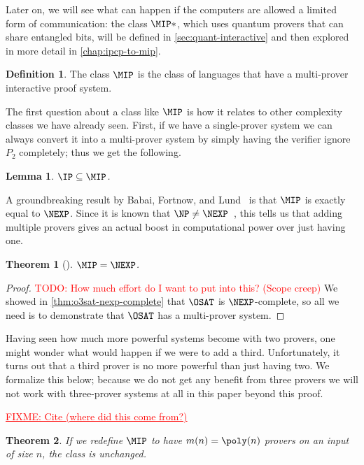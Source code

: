 \documentclass[english,12pt]{reedthesis}
\theoremstyle{plain}
\newtheorem{thm}{Theorem}[section]
\newtheorem{lemma}[lemma]{Lemma}
\theoremstyle{definition}
\newtheorem{defn}[defn]{Definition}
\theoremstyle{remark}
\newcommand{\TODO}[1]{\textcolor{red}{TODO: #1}}
\newcommand{\FIXME}[1]{\textcolor{red}{\underline{FIXME: #1}}}
\begin{document}
Later on, we will see what can happen if the computers are allowed a limited
form of communication: the class $\MIP*$, which uses quantum provers that can
share entangled bits, will be defined in \cref{sec:quant-interactive} and then
explored in more detail in \cref{chap:ipcp-to-mip}.

\begin{defn}\label{def:mip}
  The class $\MIP$ is the class of languages that have a multi-prover
  interactive proof system.
\end{defn}

The first question about a class like $\MIP$ is how it relates to other
complexity classes we have already seen. First, if we have a single-prover
system we can always convert it into a multi-prover system by simply having the
verifier ignore $P_{2}$ completely; thus we get the following.

\begin{lemma}\label{lem:ip-in-mip}
  $\IP \subseteq \MIP$.
\end{lemma}

A groundbreaking result by Babai, Fortnow, and Lund~\cite{BFL90} is that $\MIP$
is exactly equal to $\NEXP$. Since it is known that $\NP \ne \NEXP$~\cite{Cook73},
this tells us that adding multiple provers gives an actual boost in
computational power over just having one.

\begin{thm}[{\cite{BFL90}}]\label{thm:mip-is-nexp}
  $\MIP = \NEXP$.
\end{thm}

\begin{proof}
  \TODO{How much effort do I want to put into this? (Scope creep)}
  We showed in \cref{thm:o3sat-nexp-complete} that $\OSAT$ is $\NEXP$-complete,
  so all we need is to demonstrate that $\OSAT$ has a multi-prover system.
\end{proof}

Having seen how much more powerful systems become with two provers, one might
wonder what would happen if we were to add a third. Unfortunately, it turns out
that a third prover is no more powerful than just having two. We formalize this
below; because we do not get any benefit from three provers we will not work
with three-prover systems at all in this paper beyond this proof.

\FIXME{Cite (where did this come from?)}
\begin{thm}\label{thm:mip-unchanged}
  If we redefine $\MIP$ to have $m(n) = \poly(n)$ provers on an input of size
  $n$, the class is unchanged.
\end{thm}
\end{document}
